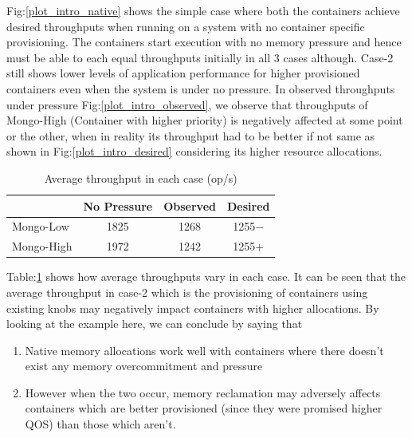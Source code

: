 	Fig:\ref{plot_intro_native} shows the simple case where both the containers achieve desired throughputs when running on a system 
with no container specific provisioning. The containers start execution with no memory pressure and hence must be able to each equal 
throughputs initially in all 3 cases although. Case-2 still shows lower levels of application performance for higher provisioned 
containers even when the system is under no pressure. In observed throughputs under pressure Fig:\ref{plot_intro_observed}, we 
observe that throughputs of Mongo-High (Container with higher priority) is negatively affected at some point or the other, when in reality 
its throughput had to be better if not same as shown in Fig:\ref{plot_intro_desired} considering its higher resource allocations. 
	
	\pagebreak

	\begin{table}
	  \begin{center}
	    \begin{tabular}{ l | c | c | c }	      	    
		  & No Pressure & Observed & Desired \\ 
	      \hline
	      \hline
	      Mongo-Low  & 1825 & 1268 & 1255$-$ \\  
	      \hline
	      Mongo-High & 1972 & 1242 & 1255$+$ \\
		
	    \end{tabular}
	  \caption{Average throughput in each case (op/s)}
	  \label{table_intro_th}
	  \end{center}	  
	\end{table}
	
	Table:\ref{table_intro_th} shows how average throughputs vary in each case. It can be seen that the average throughput in case-2 
which is the provisioning of containers using existing knobs may negatively impact containers with higher allocations. By looking at the 
example here, we can conclude by saying that 
	
	\begin{enumerate}
	  \item Native memory allocations work well with containers where there doesn't exist any memory overcommitment and pressure
	  \item However when the two occur, memory reclamation may adversely affects containers which are better provisioned (since they 
were promised higher QOS) than those which aren't.
	\end{enumerate}
    
